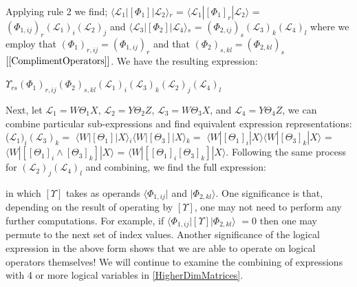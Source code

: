 \documentclass[10pt]{article}
\newcommand*{\inbkthree}[3]{$\langle {#1}|[#2]|{#3} \rangle $}
\newcommand{\ket}[1]{$|{#1}\rangle$}
\newcommand{\bra}[1]{$\langle{#1}|$}
\newcommand{\matrify}[1]{$[{#1}]$}
\begin{document}
Applying rule 2 we find; \inbkthree{\mathcal{L}_1}{\Phi_1}{\mathcal{L}_2}$_r$ =  $\langle \mathcal{L}_1|[\Phi_1]_r| \mathcal{L}_2 \rangle$ = $(\Phi_{1,ij})_{r}(\mathcal{L}_1)_i(\mathcal{L}_2)_j$ and \inbkthree{\mathcal{L}_3}{\Phi_2}{\mathcal{L}_4}$_s$ = $(\Phi_{2,ij})_{s}(\mathcal{L}_3)_k(\mathcal{L}_4)_l$ where we employ that $(\Phi_{1})_{r,ij} = (\Phi_{1,ij})_{r}$ and that $(\Phi_2)_{s,kl} = (\Phi_{2,kl})_s$ $[\ref{ComplimentOperators}]$. We have the resulting expression:
\begin{center}
$\Upsilon_{rs}(\Phi_{1})_{r,ij}(\Phi_{2})_{s,kl}(\mathcal{L}_1)_i(\mathcal{L}_3)_k(\mathcal{L}_2)_j(\mathcal{L}_4)_l$
\end{center}
Next, let $\mathcal{L}_1 = W \Theta_1 X$, $\mathcal{L}_2 = Y \Theta_2 Z$, $\mathcal{L}_3 = W \Theta_3 X$, and $\mathcal{L}_4 = Y \Theta_4 Z$, we can combine particular sub-expressions and find equivalent expression representations: ($\mathcal{L}_1)_i(\mathcal{L}_3)_k =$ \inbkthree{W}{\Theta_1}{X}$_i$\inbkthree{W}{\Theta_3}{X}$_k = $ $\langle W|[\Theta_1]_i| X \rangle \langle W|[\Theta_3]_k| X \rangle$ = \inbkthree{W}{[\Theta_1]_i \wedge [\Theta_3]_k}{X} = \inbkthree{W}{[\Theta_1]_i[\Theta_3]_k}{X}. Following the same process for $(\mathcal{L}_2)_j(\mathcal{L}_4)_l$ and combining, we find the full expression:
\begin{center}
\noindent\fbox{\begin{minipage}[t][3\height][c]{\dimexpr\textwidth-20\fboxsep-2\fboxrule\relax}
\centering
\inbkthree{\Phi_{1,ij}}{\Upsilon}{\Phi_{2,kl}}\inbkthree{W}{[\Theta_1]_i[\Theta_3]_k}{X}\inbkthree{Y}{[\Theta_2]_j[\Theta_4]_l}{Z}
\end{minipage}}
\end{center}
in which \matrify{\Upsilon} takes as operands \bra{\Phi_{1,ij}} and \ket{\Phi_{2,kl}}. One significance is that, depending on the result of operating by \matrify{\Upsilon}, one may not need to perform any further computations. For example, if \inbkthree{\Phi_{1,ij}}{\Upsilon}{\Phi_{2,kl}} $= 0$ then one may permute to the next set of index values. Another significance of the logical expression in the above form shows that we are able to operate on logical operators themselves! We will continue to examine the combining of expressions with 4 or more logical variables in \ref{HigherDimMatrices}. 
\end{document}

